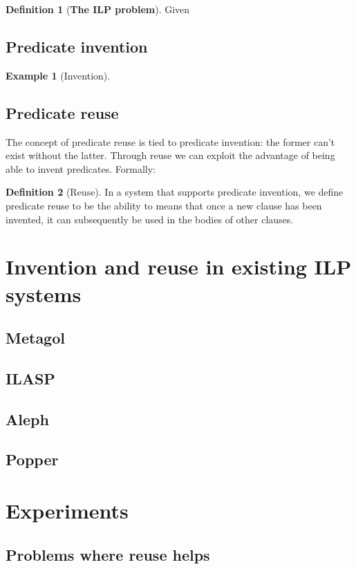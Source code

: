 \documentclass{article}
\newtheorem{example}{Example}
\theoremstyle{definition}
\newtheorem{defn}{Definition}[section]
\begin{document}
\begin{defn}[\textbf{The ILP problem}]
Given 
\end{defn}

\subsection{Predicate invention}
\begin{example}[Invention]

\end{example}
 
\subsection{Predicate reuse}
The concept of predicate reuse is tied to predicate invention: the former can't exist without the latter. Through reuse we can exploit the advantage of being able to invent predicates. Formally:

\begin{defn}[Reuse]
In a system that supports predicate invention, we define predicate reuse to be the ability to means that once a new clause has been invented, it can subsequently be used in the bodies of other clauses.
\end{defn}



\section{Invention and reuse in existing ILP systems}
\subsection{Metagol}
\subsection{ILASP}
\subsection{Aleph}
\subsection{Popper}



\section{Experiments}
\subsection{Problems where reuse helps}
\end{document}
